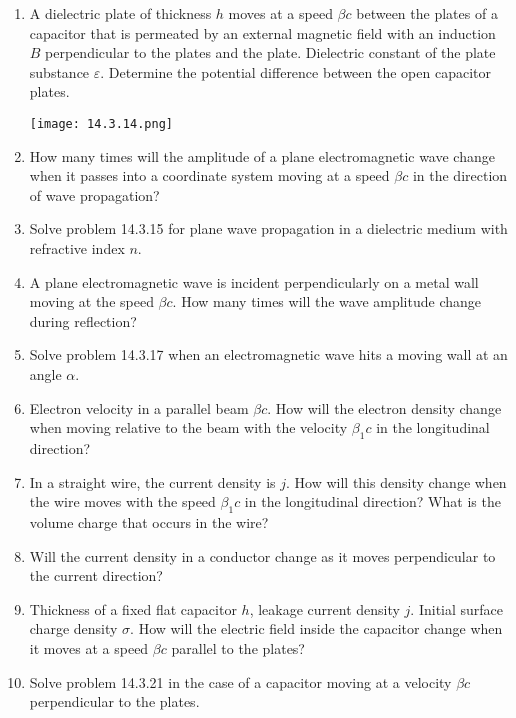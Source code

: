 \documentclass{article}
\begin{document}
\begin{enumerate}[label=14.3.\arabic*]
\item A dielectric plate of thickness $h$ moves at a speed $\beta c$ between the plates of a capacitor that is permeated by an external magnetic field with an induction $B$ perpendicular to the plates and the plate. Dielectric constant of the plate substance $\varepsilon$. Determine the potential difference between the open capacitor plates.

\begin{center}
    \texttt{[image: 14.3.14.png]}
\end{center}

\item How many times will the amplitude of a plane electromagnetic wave change when it passes into a coordinate system moving at a speed $\beta c$ in the direction of wave propagation?

\item Solve problem 14.3.15 for plane wave propagation in a dielectric medium with refractive index $n$.

\item A plane electromagnetic wave is incident perpendicularly on a metal wall moving at the speed $\beta c$. How many times will the wave amplitude change during reflection?

\item Solve problem 14.3.17 when an electromagnetic wave hits a moving wall at an angle $\alpha$.

\item Electron velocity in a parallel beam $\beta c$. How will the electron density change when moving relative to the beam with the velocity $\beta_1 c$ in the longitudinal direction?

\item In a straight wire, the current density is $j$. How will this density change when the wire moves with the speed $\beta_1 c$ in the longitudinal direction? What is the volume charge that occurs in the wire?

\item Will the current density in a conductor change as it moves perpendicular to the current direction?

\item Thickness of a fixed flat capacitor $h$, leakage current density $j$. Initial surface charge density $\sigma$. How will the electric field inside the capacitor change when it moves at a speed $\beta c$ parallel to the plates?

\item Solve problem 14.3.21 in the case of a capacitor moving at a velocity $\beta c$ perpendicular to the plates.


\end{enumerate}
\end{document}
